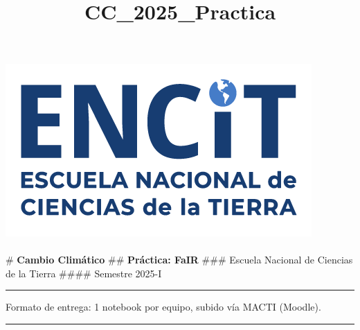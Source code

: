 \documentclass[11pt]{article}
\title{CC\_2025\_Practica}
\begin{document}
    
    \maketitle
    
    

    
    \hypertarget{logo_encit.png}{%
\subsection{\texorpdfstring{\protect\includegraphics{CC_2025_Practica_files/398ea254-5a51-4d41-b547-e7c65669aab9.png}}{LOGO\_ENCIT.png}}\label{logo_encit.png}}

\# \textbf{ Cambio Climático } \#\# \textbf{Práctica: FaIR } \#\#\#
Escuela Nacional de Ciencias de la Tierra \#\#\#\# Semestre 2025-I

\begin{center}\rule{0.5\linewidth}{0.5pt}\end{center}

Formato de entrega: 1 notebook por equipo, subido vía MACTI (Moodle).

\begin{center}\rule{0.5\linewidth}{0.5pt}\end{center}
\end{document}
